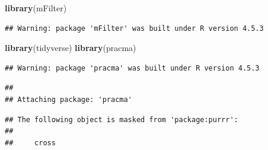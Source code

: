 \documentclass[
]{article}
\newenvironment{Shaded}{\begin{snugshade}}{\end{snugshade}}
\newcommand{\AttributeTok}[1]{\textcolor[rgb]{0.13,0.29,0.53}{#1}}
\newcommand{\DecValTok}[1]{\textcolor[rgb]{0.00,0.00,0.81}{#1}}
\newcommand{\FunctionTok}[1]{\textcolor[rgb]{0.13,0.29,0.53}{\textbf{#1}}}
\newcommand{\NormalTok}[1]{#1}
\newcommand{\OtherTok}[1]{\textcolor[rgb]{0.56,0.35,0.01}{#1}}
\newcommand{\SpecialCharTok}[1]{\textcolor[rgb]{0.81,0.36,0.00}{\textbf{#1}}}
\newcommand{\StringTok}[1]{\textcolor[rgb]{0.31,0.60,0.02}{#1}}
\begin{document}
\begin{Shaded}
\begin{Highlighting}[]
\FunctionTok{library}\NormalTok{(mFilter)}
\end{Highlighting}
\end{Shaded}

\begin{verbatim}
## Warning: package 'mFilter' was built under R version 4.5.3
\end{verbatim}

\begin{Shaded}
\begin{Highlighting}[]
\FunctionTok{library}\NormalTok{(tidyverse)}
\FunctionTok{library}\NormalTok{(pracma)}
\end{Highlighting}
\end{Shaded}

\begin{verbatim}
## Warning: package 'pracma' was built under R version 4.5.3
\end{verbatim}

\begin{verbatim}
## 
## Attaching package: 'pracma'
\end{verbatim}

\begin{verbatim}
## The following object is masked from 'package:purrr':
## 
##     cross
\end{verbatim}

\begin{Shaded}
\end{Shaded}
\end{document}
